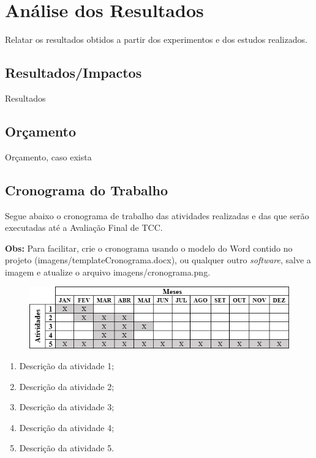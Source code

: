 \chapter{Análise dos Resultados}
\label{cap:04}

Relatar os resultados obtidos a partir dos experimentos e dos estudos realizados. 


\section{Resultados/Impactos}

Resultados


\section{Orçamento}

Orçamento, caso exista


\section{Cronograma do Trabalho}

Segue abaixo o cronograma de trabalho das atividades realizadas e das que serão executadas até a Avaliação Final de TCC.

\textbf{Obs:} Para facilitar, crie o cronograma usando o modelo do Word contido no projeto (imagens/templateCronograma.docx), ou qualquer outro \textit{software}, salve a imagem e atualize o arquivo imagens/cronograma.png.

\FloatBarrier
\begin{figure}[!htbp]
	\centering
	\includegraphics[scale=1]{imagens/cronograma}
\end{figure}
\FloatBarrier

\begin{enumerate}
	\item Descrição da atividade 1;
	\item Descrição da atividade 2;
	\item Descrição da atividade 3;
	\item Descrição da atividade 4;
	\item Descrição da atividade 5.
\end{enumerate}
